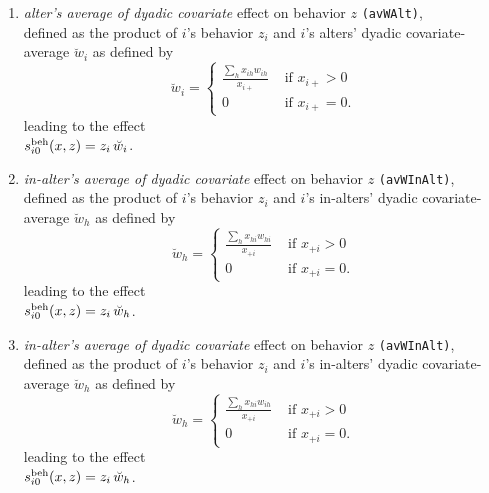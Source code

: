 \documentclass[a4paper,fleqn,11pt]{article}
\newcommand{\+}{\, + \,}
\newcommand{\vit}{\theenumi}
\newcounter{savenumi}
\begin{document}
\begin{enumerate}
\setcounter{enumi}{\value{savenumi}}

\item \emph{alter's  average of dyadic covariate } effect on behavior $z$
 \texttt{(avWAlt)},\\
      defined as the product of $i$'s behavior $z_i$ and
      $i$'s alters' dyadic covariate-average $\breve w_i$ as defined by
\begin{equation}
  \breve w_i = \left\{\begin{array}{ll} \displaystyle
         \frac{\sum_h x_{ih}w_{ih}}{x_{i+}}  &  \text{ if } x_{i+} > 0     \\
         0                                &  \text{ if } x_{i+} = 0  .
  \end{array}   \right.            \label{alt_avwa}
\end{equation}
      leading to the effect \\
       $s^{\rm beh}_{i\vit}(x, z) = z_i \, \breve w_i $.\\

\item \emph{in-alter's  average of dyadic covariate } effect on behavior $z$
 \texttt{(avWInAlt)},\\
      defined as the product of $i$'s behavior $z_i$ and
      $i$'s in-alters' dyadic covariate-average $\breve w_h$ as defined by
\begin{equation}
  \breve w_h = \left\{\begin{array}{ll} \displaystyle
         \frac{\sum_h x_{hi}w_{hi}}{x_{+i}}  &  \text{ if } x_{+i} > 0     \\
         0                                &  \text{ if } x_{+i} = 0  .
  \end{array}   \right.            \label{alt_avwa}
\end{equation}
      leading to the effect \\
       $s^{\rm beh}_{i\vit}(x, z) = z_i \, \breve w_h $.\\

\item \emph{in-alter's  average of dyadic covariate } effect on behavior $z$
 \texttt{(avWInAlt)},\\
      defined as the product of $i$'s behavior $z_i$ and
      $i$'s in-alters' dyadic covariate-average $\breve w_h$ as defined by
\begin{equation}
  \breve w_h = \left\{\begin{array}{ll} \displaystyle
         \frac{\sum_h x_{hi}w_{ih}}{x_{+i}}  &  \text{ if } x_{+i} > 0     \\
         0                                &  \text{ if } x_{+i} = 0  .
  \end{array}   \right.            \label{alt_avwa}
\end{equation}
      leading to the effect \\
       $s^{\rm beh}_{i\vit}(x, z) = z_i \, \breve w_h $.\\


\end{enumerate}
\end{document}
